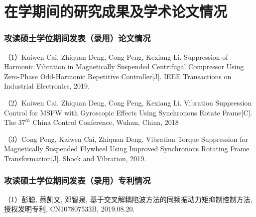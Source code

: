 \chapter{在学期间的研究成果及学术论文情况}

\subsection*{攻读硕士学位期间发表（录用）论文情况}

（1）Kaiwen Cai, Zhiquan Deng, Cong Peng, Kexiang Li. Suppression of Harmonic Vibration in Magnetically Suspended Centrifugal Compressor Using Zero-Phase Odd-Harmonic Repetitive Controller[J]. IEEE Transactions on Industrial Electronics, 2019.

（2）Kaiwen Cai, Zhiquan Deng, Cong Peng, Kexiang Li. Vibration Suppression Control for MSFW with Gyroscopic Effects Using Synchronous Rotate Frame[C]. The $37^{th}$ China Control Conference, Wuhan, China, 2018
 
（3）Cong Peng, Kaiwen Cai, Zhiquan Deng. Vibration Torque Suppression for Magnetically Suspended Flywheel Using Improved Synchronous Rotating Frame Transformation[J]. Shock and Vibration, 2019.

\subsection*{攻读硕士学位期间发表（录用）专利情况}

（1）彭聪, 蔡凯文, 邓智泉, 基于交叉解耦陷波方法的同频振动力矩抑制控制方法, 授权发明专利, CN107807533B, 2019.08.20.


